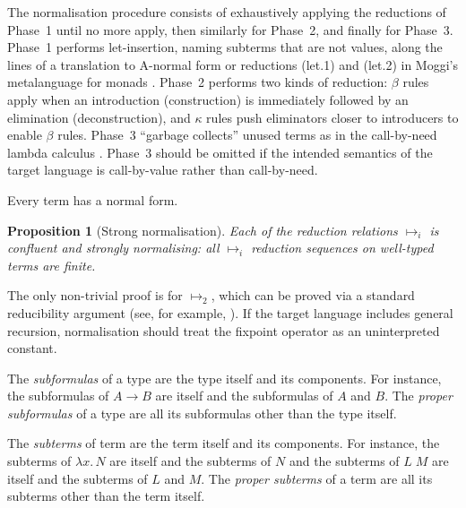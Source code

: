 \documentclass[authoryear,9pt]{sigplanconf}
\newtheorem{proposition}[theorem]{Proposition}
\newcommand{\app}{\;}
\newcommand{\expabs}[3]{\lambda#1.\,#3}
\newcommand{\expapp}[2]{#1 \app #2}
\newcommand{\rewrite}[1]{\mathbin{\mapsto_{#1}}}
\begin{document}
The normalisation procedure consists of exhaustively applying the
reductions of Phase~1 until no more apply, then similarly for Phase~2,
and finally for Phase~3.  Phase~1 performs let-insertion, naming
subterms that are not values, along the lines of a translation to
A-normal form \citep{a-normal-form} or reductions (let.1) and (let.2)
in Moggi's metalanguage for monads \citep{Moggi-1991}.
Phase~2 performs two kinds of reduction: $\beta$ rules apply when an
introduction (construction) is immediately followed by an elimination
(deconstruction), and $\kappa$ rules push eliminators closer to
introducers to enable $\beta$ rules.  Phase~3 ``garbage collects''
unused terms as in the call-by-need lambda calculus
\citep{call-by-need}. Phase~3 should be omitted if the intended
semantics of the target language is call-by-value rather than
call-by-need.

Every term has a normal form.
\begin{proposition}[Strong normalisation]
Each of the reduction relations $\rewrite{i}$ is confluent and strongly
normalising: all $\rewrite{i}$ reduction sequences on well-typed
terms are finite.
\end{proposition}
The only non-trivial proof is for $\rewrite{2}$, which can be proved
via a standard reducibility argument (see, for example,
\cite{Lindley07}). If the target language includes general recursion,
normalisation should treat the fixpoint operator as an uninterpreted
constant.


The \emph{subformulas} of a type are the type itself and its
components. For instance, the subformulas of $A \to B$ are itself and
the subformulas of $A$ and $B$. The \emph{proper subformulas} of a
type are all its subformulas other than the type itself.

The \emph{subterms} of term are the term itself and its components.
For instance, the subterms of $\expabs{x}{}{N}$ are itself and the
subterms of $N$ and the subterms of $\expapp{L}{M}$ are itself and the
subterms of $L$ and $M$. The \emph{proper subterms} of a
term are all its subterms other than the term itself.
\end{document}
